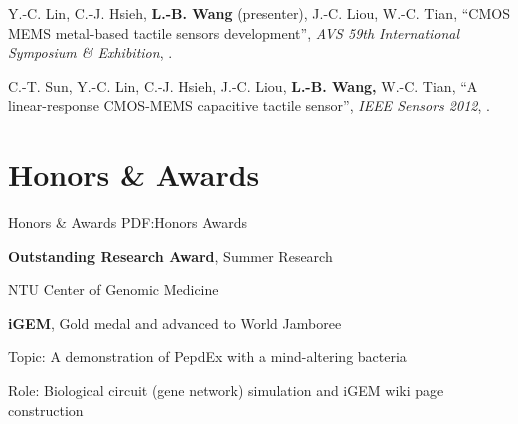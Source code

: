 \documentclass[a4paper,10pt,oneside]{article}
\begin{document}
\begin{body}
\begin{publication}[widest*=100]
    \item
        Y.-C. Lin, C.-J. Hsieh, \textbf{L.-B. Wang} (presenter), J.-C. Liou, W.-C. Tian,
        ``CMOS MEMS metal-based tactile sensors development'',
        \textit{AVS 59th International Symposium \& Exhibition},
        .

    \item
        C.-T. Sun, Y.-C. Lin, C.-J. Hsieh, J.-C. Liou, \textbf{L.-B. Wang,} W.-C. Tian,
        ``A linear-response CMOS-MEMS capacitive tactile sensor'',
        \textit{IEEE Sensors 2012},
        .

\end{publication}


\section
{Honors\newline
\& Awards}
{Honors \& Awards}
{PDF:Honors Awards}

\textbf{Outstanding Research Award}, Summer Research
\hfill
{}
\par
NTU Center of Genomic Medicine


\EntryGap
\textbf{iGEM},
Gold medal and advanced to World Jamboree
\hfill
{}
\begin{detail}
    \begin{detailitem}
    \item Topic: A demonstration of PepdEx with a mind-altering bacteria
    \item Role: Biological circuit (gene network) simulation and iGEM wiki page construction
    \end{detailitem}
\end{detail}



\end{body}
\end{document}
